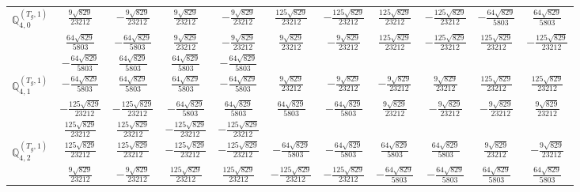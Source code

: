 \documentclass[fleqn,10pt,landscape]{article}
\begin{document}
\begin{itemize}
{\begin{center}
\begin{longtable}{ccccccccccc}
$\mathbb{Q}_{4,0}^{(T_{g},1)}$ & $ \frac{9 \sqrt{829}}{23212} $ & $ - \frac{9 \sqrt{829}}{23212} $ & $ \frac{9 \sqrt{829}}{23212} $ & $ - \frac{9 \sqrt{829}}{23212} $ & $ \frac{125 \sqrt{829}}{23212} $ & $ - \frac{125 \sqrt{829}}{23212} $ & $ \frac{125 \sqrt{829}}{23212} $ & $ - \frac{125 \sqrt{829}}{23212} $ & $ - \frac{64 \sqrt{829}}{5803} $ & $ \frac{64 \sqrt{829}}{5803} $ \\
& $ \frac{64 \sqrt{829}}{5803} $ & $ - \frac{64 \sqrt{829}}{5803} $ & $ \frac{9 \sqrt{829}}{23212} $ & $ - \frac{9 \sqrt{829}}{23212} $ & $ \frac{9 \sqrt{829}}{23212} $ & $ - \frac{9 \sqrt{829}}{23212} $ & $ \frac{125 \sqrt{829}}{23212} $ & $ - \frac{125 \sqrt{829}}{23212} $ & $ \frac{125 \sqrt{829}}{23212} $ & $ - \frac{125 \sqrt{829}}{23212} $ \\
& $ - \frac{64 \sqrt{829}}{5803} $ & $ \frac{64 \sqrt{829}}{5803} $ & $ \frac{64 \sqrt{829}}{5803} $ & $ - \frac{64 \sqrt{829}}{5803} $ & $  $ & $  $ & $  $ & $  $ & $  $ & $  $ \\ \hline
$\mathbb{Q}_{4,1}^{(T_{g},1)}$ & $ - \frac{64 \sqrt{829}}{5803} $ & $ \frac{64 \sqrt{829}}{5803} $ & $ \frac{64 \sqrt{829}}{5803} $ & $ - \frac{64 \sqrt{829}}{5803} $ & $ \frac{9 \sqrt{829}}{23212} $ & $ - \frac{9 \sqrt{829}}{23212} $ & $ - \frac{9 \sqrt{829}}{23212} $ & $ \frac{9 \sqrt{829}}{23212} $ & $ \frac{125 \sqrt{829}}{23212} $ & $ \frac{125 \sqrt{829}}{23212} $ \\
& $ - \frac{125 \sqrt{829}}{23212} $ & $ - \frac{125 \sqrt{829}}{23212} $ & $ - \frac{64 \sqrt{829}}{5803} $ & $ \frac{64 \sqrt{829}}{5803} $ & $ \frac{64 \sqrt{829}}{5803} $ & $ - \frac{64 \sqrt{829}}{5803} $ & $ \frac{9 \sqrt{829}}{23212} $ & $ - \frac{9 \sqrt{829}}{23212} $ & $ - \frac{9 \sqrt{829}}{23212} $ & $ \frac{9 \sqrt{829}}{23212} $ \\
& $ \frac{125 \sqrt{829}}{23212} $ & $ \frac{125 \sqrt{829}}{23212} $ & $ - \frac{125 \sqrt{829}}{23212} $ & $ - \frac{125 \sqrt{829}}{23212} $ & $  $ & $  $ & $  $ & $  $ & $  $ & $  $ \\ \hline
$\mathbb{Q}_{4,2}^{(T_{g},1)}$ & $ \frac{125 \sqrt{829}}{23212} $ & $ \frac{125 \sqrt{829}}{23212} $ & $ - \frac{125 \sqrt{829}}{23212} $ & $ - \frac{125 \sqrt{829}}{23212} $ & $ - \frac{64 \sqrt{829}}{5803} $ & $ - \frac{64 \sqrt{829}}{5803} $ & $ \frac{64 \sqrt{829}}{5803} $ & $ \frac{64 \sqrt{829}}{5803} $ & $ \frac{9 \sqrt{829}}{23212} $ & $ - \frac{9 \sqrt{829}}{23212} $ \\
& $ \frac{9 \sqrt{829}}{23212} $ & $ - \frac{9 \sqrt{829}}{23212} $ & $ \frac{125 \sqrt{829}}{23212} $ & $ \frac{125 \sqrt{829}}{23212} $ & $ - \frac{125 \sqrt{829}}{23212} $ & $ - \frac{125 \sqrt{829}}{23212} $ & $ - \frac{64 \sqrt{829}}{5803} $ & $ - \frac{64 \sqrt{829}}{5803} $ & $ \frac{64 \sqrt{829}}{5803} $ & $ \frac{64 \sqrt{829}}{5803} $ \\

\end{longtable}
\end{center}}
\end{itemize}
\end{document}
